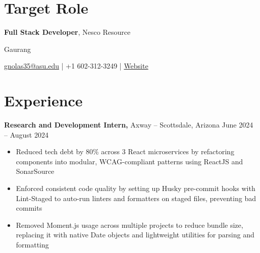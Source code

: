 \documentclass[11pt]{article}       %
\begin{document}
\section*{Target Role}
\textbf{Full Stack Developer}, Nesco Resource\\
\vspace{10pt}


\centerline{\Huge Gaurang}
\vspace{5pt}

\centerline{\href{mailto:gnolas35@asu.edu}{gnolas35@asu.edu} | +1 602-312-3249 
| \href{https://portfolio-sinedd777s-projects.vercel.app/}{Website}}
\vspace{-10pt}

\section*{Experience}
\textbf{Research and Development Intern,} {Axway} -- Scottsdale, Arizona \hfill June 2024 -- August 2024 \\
\vspace{-9pt}
\begin{itemize}
\item Reduced tech debt by 80\% across 3 React microservices by refactoring components into modular, WCAG-compliant patterns using ReactJS and SonarSource
\item Enforced consistent code quality by setting up Husky pre-commit hooks with Lint-Staged to auto-run linters and formatters on staged files, preventing bad commits
\item Removed Moment.js usage across multiple projects to reduce bundle size, replacing it with native Date objects and lightweight utilities for parsing and formatting
\end{itemize}
\vspace{10pt}
\end{document}
